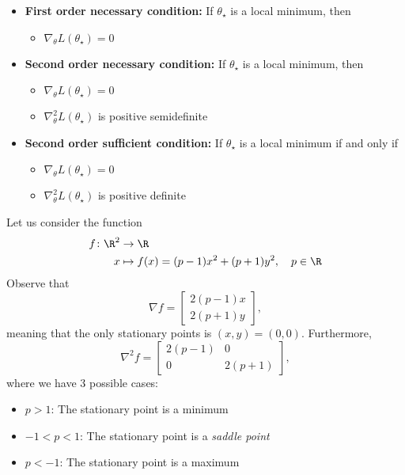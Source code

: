 \begin{itemize}
	\item \textbf{First order necessary condition:} If $\theta_\star$ is a local minimum, then 
	\begin{itemize}
		\item $\nabla_\theta L(\theta_\star)=0$
	\end{itemize}
	\item \textbf{Second order necessary condition:} If $\theta_\star$ is a local minimum, then 
	\begin{itemize}
		\item $\nabla_\theta L(\theta_\star)=0$
		\item $\nabla^ 2_\theta L(\theta_\star)$ is positive semidefinite
	\end{itemize}
	\item \textbf{Second order sufficient condition:} If $\theta_\star$ is a local minimum if and only if 
	\begin{itemize}
		\item $\nabla_\theta L(\theta_\star)=0$
		\item $\nabla^ 2_\theta L(\theta_\star)$ is positive definite
	\end{itemize}
\end{itemize}


\begin{mdframed}[style=ejemplo, frametitle={\center Example: different stationary points}]

Let us consider the function
\begin{align}
  f \colon \R^2 &\to \R\nonumber\\
  x &\mapsto f(x)=(p-1)x^2 + (p+1)y^2,\quad p\in\R
   \label{eq:example_fn_stationary_points} 
\end{align}
Observe that
\begin{equation}
	\nabla f = \begin{bmatrix}   2(p-1)x \\ 2(p+1)y   \end{bmatrix},
	\label{eq:nabla_example_fn_stationary_points}
\end{equation}
meaning that the only stationary points is  $(x,y) = (0,0)$. Furthermore, 
\begin{equation}
	\nabla^2 f = \begin{bmatrix}   2(p-1) & 0 \\ 0 & 2(p+1)   \end{bmatrix},
	\label{eq:nabla2_example_fn_stationary_points}
\end{equation}
where we have 3 possible cases: 

\begin{itemize}
	\item $p>1$: The stationary point is a minimum
	\item $-1<p<1$: The stationary point is a \emph{saddle point}
		\item $p<-1$: The stationary point is a maximum
\end{itemize}


\end{mdframed}


